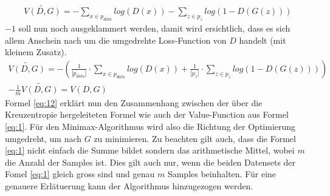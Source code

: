 \begin{align}
    \widetilde{V(D,G)} = - \sum_{x \in p_{data}} log(D(x)) - \sum_{z \in p_{z}} log(1 - D(G(z)))
\end{align}
$-1$ soll nun noch ausgeklammert werden, damit wird ersichtlich, dass es sich allem Anschein nach um die
umgedrehte Loss-Function von $D$ handelt (mit kleinem Zusatz).
\begin{align}
    \widetilde{V(D,G)} = - (\frac{1}{|p_{data}|} \cdot \sum_{x \in p_{data}} log(D(x)) + \frac{1}{|p_{z}|} \cdot \sum_{z \in p_{z}} log(1 - D(G(z))))\\
    -\frac{1}{m} \widetilde{V(D,G)} = V(D,G)\label{eq:12}
\end{align}
Formel \ref{eq:12} erklärt nun den Zusammenhang zwischen der über die Kreuzentropie hergeleiteten Formel wie auch der Value-Function aus Formel \ref{eq:1}.
Für den Minimax-Algorithmus wird also die Richtung der Optimierung umgedreht, um nach $G$ zu minimieren. Zu beachten gilt auch,
dass die Formel \ref{eq:1} nicht einfach die Summe bildet sondern das arithmetische Mittel, wobei $m$ die Anzahl der Samples
ist. Dies gilt auch nur, wenn die beiden Datensets der Fomel \ref{eq:1} gleich gross sind und genau $m$ Samples
beinhalten. Für eine genauere Erlätuerung kann der Algorithmus \label{alg:1} hinzugezogen werden.

\newpage
